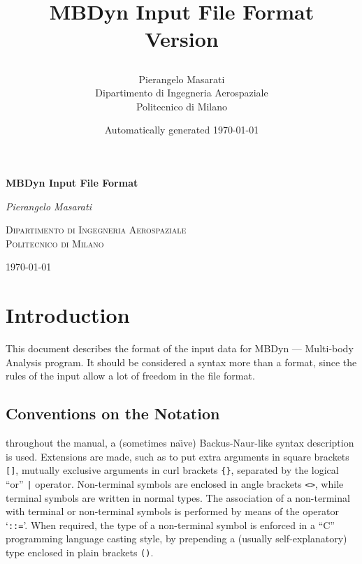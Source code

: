 \documentclass[10pt,dvips]{report}
\begin{document}
\begin{latexonly}
\title{\bf MBDyn Input File Format \\
Version

}
\author{Pierangelo Masarati \vspace{5mm}\\
    \sc Dipartimento di Ingegneria Aerospaziale \\
    \sc Politecnico di Milano}
\date{Automatically generated \today}
\maketitle
\end{latexonly}

\begin{htmlonly}
\begin{center}
\textbf{\LARGE MBDyn Input File Format}

\emph{\large Pierangelo Masarati}

\textsc{Dipartimento di Ingegneria Aerospaziale \\ Politecnico di Milano}

\today
\end{center}
\end{htmlonly}




\tableofcontents
\newpage

\chapter{Introduction}
This document describes the format of the input data for MBDyn ---
Multi-body Analysis program.
It should be considered a syntax more than a format, since the rules of the
input allow a lot of freedom in the file format. 

\section{Conventions on the Notation}
throughout the manual, a (sometimes na\"{\i}ve) 
Backus-Naur-like syntax description is used. 
Extensions are made, such as to put extra arguments in square brackets
\texttt{[]}, mutually exclusive arguments in curl brackets \texttt{\{\}},
separated by the logical ``or'' \texttt{|} operator.
Non-terminal symbols are enclosed in angle brackets \texttt{<>}, while
terminal symbols are written in normal types.
The association of a non-terminal with terminal or non-terminal
symbols is performed by means of the operator `\texttt{::=}'. 
When required, the type of a non-terminal symbol is enforced in a ``C''
programming language casting style, by prepending a (usually
self-explanatory) type enclosed in plain brackets \texttt{()}.
\end{document}
